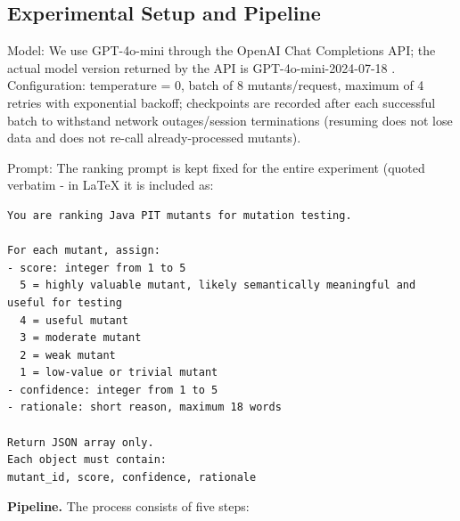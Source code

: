 \subsection{Experimental Setup and Pipeline}
Model: We use GPT-4o-mini through the OpenAI Chat Completions API; the actual model version returned by the API is GPT-4o-mini-2024-07-18 \cite{openai2024gpt4omini}. Configuration: temperature = 0, batch of 8 mutants/request, maximum of 4 retries with exponential backoff; checkpoints are recorded after each successful batch to withstand network outages/session terminations (resuming does not lose data and does not re-call already-processed mutants).

Prompt: The ranking prompt is kept fixed for the entire experiment (quoted verbatim - in LaTeX it is included as:
\begin{lstlisting}
You are ranking Java PIT mutants for mutation testing.

For each mutant, assign:
- score: integer from 1 to 5
  5 = highly valuable mutant, likely semantically meaningful and useful for testing
  4 = useful mutant
  3 = moderate mutant
  2 = weak mutant
  1 = low-value or trivial mutant
- confidence: integer from 1 to 5
- rationale: short reason, maximum 18 words

Return JSON array only.
Each object must contain:
mutant_id, score, confidence, rationale
\end{lstlisting}

\textbf{Pipeline.}
The process consists of five steps:

